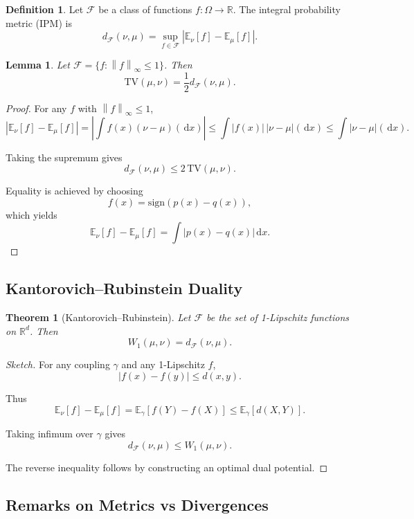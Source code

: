 \documentclass[12pt,oneside]{book}
\numberwithin{equation}{section}
\theoremstyle{definition}
\newtheorem{definition}{Definition}[section]
\theoremstyle{plain}
\newtheorem{theorem}{Theorem}[section]
\newtheorem{lemma}{Lemma}[section]
\theoremstyle{remark}
\newcommand{\R}{\mathbb{R}}
\newcommand{\E}{\mathbb{E}}
\newcommand{\norm}[1]{\left\lVert #1 \right\rVert}
\newcommand{\dd}{\,\mathrm{d}}
\begin{document}
\begin{definition}
Let $\mathcal{F}$ be a class of functions $f : \Omega \to \R$. The integral probability metric (IPM) is
\[
d_{\mathcal{F}}(\nu,\mu)
=
\sup_{f \in \mathcal{F}}
\left|
\E_\nu[f] - \E_\mu[f]
\right|.
\]
\end{definition}

\begin{lemma}
Let $\mathcal{F} = \{f : \norm{f}_{\infty} \le 1\}$. Then
\[
\mathrm{TV}(\mu,\nu) = \frac{1}{2} d_{\mathcal{F}}(\nu,\mu).
\]
\end{lemma}

\begin{proof}
For any $f$ with $\norm{f}_{\infty} \le 1$,
\[
|\E_\nu[f] - \E_\mu[f]|
=
\left| \int f(x)(\nu - \mu)(\dd x) \right|
\le \int |f(x)|\,|\nu - \mu|(\dd x)
\le \int |\nu - \mu|(\dd x).
\]

Taking the supremum gives
\[
d_{\mathcal{F}}(\nu,\mu) \le 2\,\mathrm{TV}(\mu,\nu).
\]

Equality is achieved by choosing
\[
f(x) = \mathrm{sign}(p(x) - q(x)),
\]
which yields
\[
\E_\nu[f] - \E_\mu[f] = \int |p(x)-q(x)| \dd x.
\]
\end{proof}


\subsection{Kantorovich--Rubinstein Duality}

\begin{theorem}[Kantorovich--Rubinstein]
Let $\mathcal{F}$ be the set of 1-Lipschitz functions on $\R^d$. Then
\[
W_1(\mu,\nu) = d_{\mathcal{F}}(\nu,\mu).
\]
\end{theorem}

\begin{proof}[Sketch]
For any coupling $\gamma$ and any 1-Lipschitz $f$,
\[
|f(x) - f(y)| \le d(x,y).
\]

Thus
\[
\E_\nu[f] - \E_\mu[f]
=
\E_\gamma[f(Y) - f(X)]
\le \E_\gamma[d(X,Y)].
\]

Taking infimum over $\gamma$ gives
\[
d_{\mathcal{F}}(\nu,\mu) \le W_1(\mu,\nu).
\]

The reverse inequality follows by constructing an optimal dual potential.
\end{proof}


\subsection*{Remarks on Metrics vs Divergences}
\end{document}
